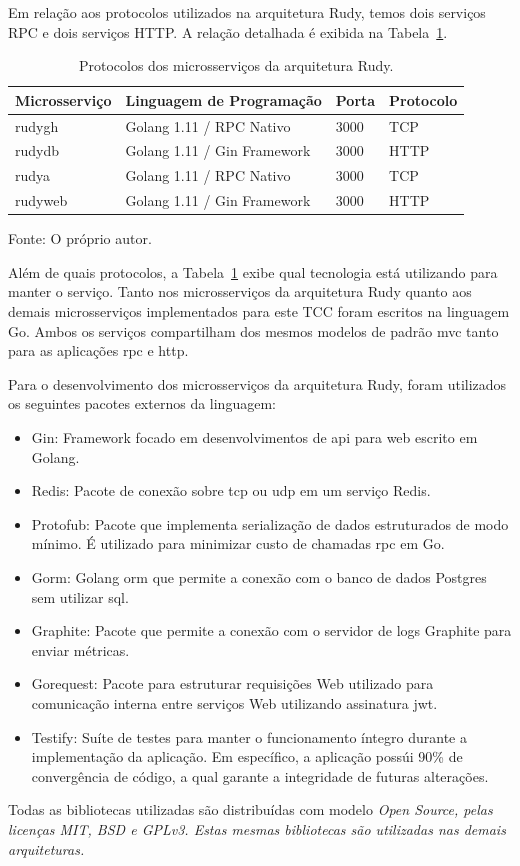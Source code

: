 Em relação aos protocolos utilizados na arquitetura Rudy, temos dois serviços RPC e dois serviços HTTP. %
%
A relação detalhada é exibida na Tabela~\ref{tab:protocolos_rudy}.



\begin{table}[htb!]
    \centering
    \caption{Protocolos dos microsserviços da arquitetura Rudy.}
    \label{tab:protocolos_rudy}
    \begin{tabular}{|l|l|l|l|}
    \hline
    Microsserviço & Linguagem de Programação    & Porta & Protocolo \\ \hline
    rudygh        & Golang 1.11 / RPC Nativo    & 3000  & TCP       \\ \hline
    rudydb        & Golang 1.11 / Gin Framework & 3000  & HTTP      \\ \hline
    rudya         & Golang 1.11 / RPC Nativo    & 3000  & TCP       \\ \hline
    rudyweb       & Golang 1.11 / Gin Framework & 3000  & HTTP      \\ \hline
    \end{tabular}
    
    Fonte: O próprio autor.
\end{table}


Além de quais protocolos, a Tabela~\ref{tab:protocolos_rudy} exibe qual tecnologia está utilizando para manter o serviço.
%
Tanto nos microsserviços da arquitetura Rudy quanto aos demais microsserviços implementados para este TCC foram escritos na linguagem Go.
%
Ambos os serviços compartilham dos mesmos modelos de padrão \ac{mvc} tanto para as aplicações \ac{rpc} e \ac{http}.

Para o desenvolvimento dos microsserviços da arquitetura Rudy, foram utilizados os seguintes pacotes externos da linguagem:

\begin{itemize}
    \item Gin: Framework focado em desenvolvimentos de \ac{api} para web escrito em Golang.
    \item Redis: Pacote de conexão sobre \ac{tcp} ou \ac{udp} em um serviço Redis.
    \item Protofub: Pacote que implementa serialização de dados estruturados de modo mínimo. É utilizado para minimizar custo de chamadas \ac{rpc} em Go.
    \item Gorm: Golang \ac{orm} que permite a conexão com o banco de dados Postgres sem utilizar \ac{sql}.
    \item Graphite: Pacote que permite a conexão com o servidor de logs Graphite para enviar métricas.
    \item Gorequest: Pacote para estruturar requisições Web utilizado para comunicação interna entre serviços Web utilizando assinatura \ac{jwt}.
    \item Testify: Suíte de testes para manter o funcionamento íntegro durante a implementação da aplicação. Em específico, a aplicação possúi 90\% de convergência de código, a qual garante a integridade de futuras alterações.
\end{itemize}

Todas as bibliotecas utilizadas são distribuídas com modelo \it{Open Source}, pelas licenças \it{MIT}, \it{BSD} e \it{GPLv3}.
%
Estas mesmas bibliotecas são utilizadas nas demais arquiteturas.
